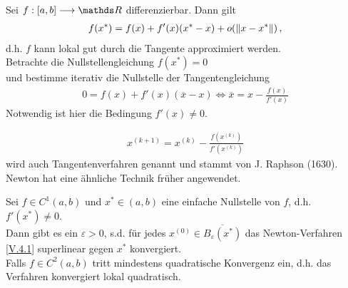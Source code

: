  
Sei $f:[a,b]\longrightarrow \R$ differenzierbar. Dann gilt
\begin{gather*}
f(x^{*}) = f(x) + f'(x)(x^{*}-x)+o(\left\| x-x^{*} \right\|) \, ,
\end{gather*} 
d.h. $f$ kann lokal gut durch die Tangente approximiert werden. \\
Betrachte die Nullstellengleichung $f(x^{*}) = 0$ \\
und bestimme iterativ die Nullstelle der Tangentengleichung
\begin{gather*}
0=f(x) + f'(x)(\overline{x}-x) \Leftrightarrow \overline{x}= x-\frac{f(x)}{f'(x)}
\end{gather*}
Notwendig ist hier die Bedingung $f'(x) \neq 0$.


\begin{gather}
x^{(k+1)} = x^{(k)} - \frac{f(x^{(k)})}{f'(x^{(k)})}
\label{V.4.1}
\end{gather}
wird auch Tangentenverfahren genannt und stammt von
J. Raphson (1630). Newton hat eine ähnliche Technik früher angewendet.

\begin{Satze}
	\label{5.4.2}
	Sei $f\in C^1(a,b)$ und $x^{*}\in (a,b)$ eine einfache Nullstelle von $f$, d.h. $f'(x^{*})\neq 0$. \\
	Dann gibt es ein  $\varepsilon >0$, s.d. für jedes $x^{(0)}\in\overline{B_\varepsilon(x^{*})}$
	das Newton-Verfahren \eqref{V.4.1} superlinear gegen $x^{*}$ konvergiert.\\
	Falls $f\in C^2(a,b) $ tritt mindestens quadratische Konvergenz ein, d.h. das Verfahren
	konvergiert lokal quadratisch.
\end{Satze}

